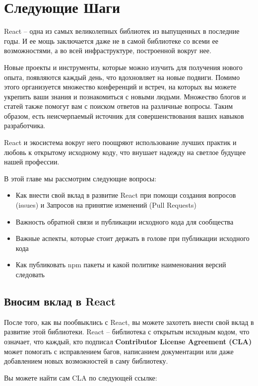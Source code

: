 \chapter{Следующие Шаги}

React -- одна из самых великолепных библиотек из выпущенных в последние годы. И ее мощь заключается даже не в самой библиотеке со всеми ее возможностями, а во всей инфраструктуре, построенной вокруг нее.

Новые проекты и инструменты, которые можно изучить для получения нового опыта, появляются каждый день, что вдохновляет на новые подвиги. Помимо этого организуется множество конференций и встреч, на которых вы можете укрепить ваши знания и познакомиться с новыми людьми. Множество блогов и статей также помогут вам с поиском ответов на различные вопросы. Таким образом, есть неисчерпаемый источник для совершенствования ваших навыков разработчика.

React и экосистема вокруг него поощряют использование лучших практик и любовь к открытому исходному коду, что внушает надежду на светлое будущее нашей профессии.

В этой главе мы рассмотрим следующие вопросы:

\begin{itemize}
  \item Как внести свой вклад в развитие React при помощи создания вопросов (issues) и Запросов на принятие изменений (Pull Requests)
  \item Важность обратной связи и публикации исходного кода для сообщества
  \item Важные аспекты, которые стоит держать в голове при публикации исходного кода
  \item Как публиковать npm пакеты и какой политике наименования версий следовать
\end{itemize}


\section{Вносим вклад в React}

После того, как вы пообвыклись с React, вы можете захотеть внести свой вклад в развитие этой библиотеки. React -- библиотека с открытым исходным кодом, что означает, что каждый, кто подписал \textbf{Contributor License Agreement (CLA)} может помогать с исправлением багов, написанием документации или даже добавлением новых возможностей в саму библиотеку.

Вы можете найти сам CLA по следующей ссылке:

